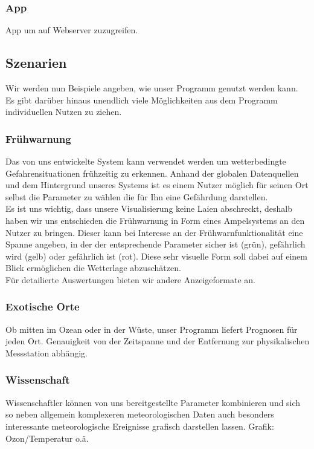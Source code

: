 \documentclass[a4paper,oneside,10pt,titlepage]{article}
\begin{document}
\subsubsection{App}
App um auf Webserver zuzugreifen.
\subsection{Szenarien}
Wir werden nun Beispiele angeben, wie unser Programm genutzt werden kann. Es gibt darüber hinaus unendlich viele Möglichkeiten aus dem Programm individuellen Nutzen zu ziehen.
\subsubsection{Frühwarnung}
Das von uns entwickelte System kann verwendet werden um wetterbedingte Gefahrensituationen frühzeitig zu erkennen. Anhand der globalen Datenquellen und dem Hintergrund unseres Systems ist es einem Nutzer möglich für seinen Ort selbst die Parameter zu wählen die für Ihn eine Gefährdung darstellen.\\
Es ist uns wichtig, dass unsere Visualisierung keine Laien abschreckt, deshalb haben wir uns entschieden die Frühwarnung in Form eines Ampelsystems an den Nutzer zu bringen. Dieser kann bei Interesse an der Frühwarnfunktionalität eine Spanne angeben, in der der entsprechende Parameter sicher ist (grün), gefährlich wird (gelb) oder gefährlich ist (rot). Diese sehr visuelle Form soll dabei auf einem Blick ermöglichen die Wetterlage abzuschätzen.\\
Für detailierte Auswertungen bieten wir andere Anzeigeformate an.
\subsubsection{Exotische Orte}
Ob mitten im Ozean oder in der Wüste, unser Programm liefert Prognosen für jeden Ort. Genauigkeit von der Zeitspanne und der Entfernung zur physikalischen Messstation abhängig.
\subsubsection{Wissenschaft}
Wissenschaftler können von uns bereitgestellte Parameter kombinieren und sich so neben allgemein komplexeren meteorologischen Daten auch besonders interessante meteorologische Ereignisse grafisch darstellen lassen.
Grafik: Ozon/Temperatur o.ä.
\end{document}
